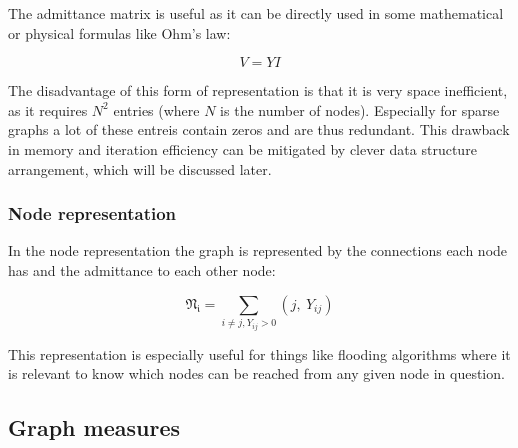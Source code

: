 The admittance matrix is useful as it can be directly used in some mathematical
or physical formulas like Ohm's law:

\begin{equation}
    V = YI
\end{equation}

The disadvantage of this form of representation is that it is very space inefficient, as it requires
$N^2$ entries (where $N$ is the number of nodes). Especially for sparse graphs a lot of these entreis contain
zeros and are thus redundant. This drawback in memory and iteration efficiency
can be mitigated by clever data structure arrangement, which will be discussed later. 

\subsubsection{Node representation}

In the node representation the graph is represented by the connections
each node has and the admittance to each other node:

\begin{equation}
    \mathfrak{N_i} = \sum_{i \ne j, Y_{ij} > 0} (j, \ Y_{ij}) 
\end{equation}

This representation is especially useful for things like flooding algorithms where it is
relevant to know which nodes can be reached from any given node in question. 

\subsection{Graph measures}